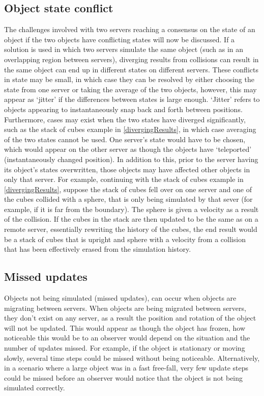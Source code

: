 \subsection{Object state conflict}
The challenges involved with two servers reaching a consensus on the state of an object if the two objects have conflicting states will now be discussed. If a solution is used in which two servers simulate the same object (such as in an overlapping region between servers), diverging results from collisions can result in the same object can end up in different states on different servers. These conflicts in state may be small, in which case they can be resolved by either choosing the state from one server or taking the average of the two objects, however, this may appear as `jitter' if the differences between states is large enough. `Jitter' refers to objects appearing to instantaneously snap back and forth between positions. Furthermore, cases may exist when the two states have diverged significantly, such as the stack of cubes example in \ref{divergingResults}, in which case averaging of the two states cannot be used. One server's state would have to be chosen, which would appear on the other server as though the objects have `teleported' (instantaneously changed position). In addition to this, prior to the server having its object's states overwritten, those objects may have affected other objects in only that server. For example, continuing with the stack of cubes example in \ref{divergingResults}, suppose the stack of cubes fell over on one server and one of the cubes collided with a sphere, that is only being simulated by that sever (for example, if it is far from the boundary). The sphere is given a velocity as a result of the collision. If the cubes in the stack are then updated to be the same as on a remote server, essentially rewriting the history of the cubes, the end result would be a stack of cubes that is upright and sphere with a velocity from a collision that has been effectively erased from the simulation history.

\subsection{Missed updates}
Objects not being simulated (missed updates), can occur when objects are migrating between servers. When objects are being migrated between servers, they don't exist on any server, as a result the position and rotation of the object will not be updated. This would appear as though the object has frozen, how noticeable this would be to an observer would depend on the situation and the number of updates missed. For example, if the object is stationary or moving slowly, several time steps could be missed without being noticeable. Alternatively, in a scenario where a large object was in a fast free-fall, very few update steps could be missed before an observer would notice that the object is not being simulated correctly.

